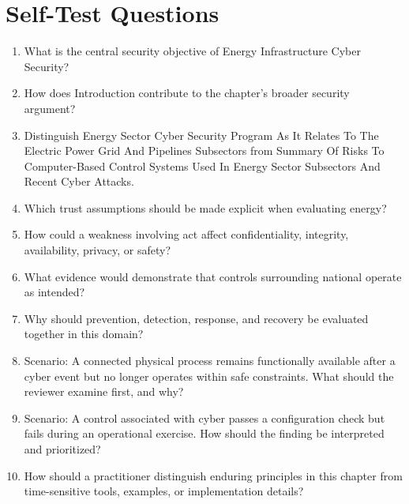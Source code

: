 \documentclass[11pt,letterpaper]{article}
\begin{document}
\section*{Self-Test Questions}
\begin{enumerate}
\item What is the central security objective of Energy Infrastructure Cyber Security?
\item How does Introduction contribute to the chapter's broader security argument?
\item Distinguish Energy Sector Cyber Security Program As It Relates To The Electric Power Grid And Pipelines Subsectors from Summary Of Risks To Computer-Based Control Systems Used In Energy Sector Subsectors And Recent Cyber Attacks.
\item Which trust assumptions should be made explicit when evaluating energy?
\item How could a weakness involving act affect confidentiality, integrity, availability, privacy, or safety?
\item What evidence would demonstrate that controls surrounding national operate as intended?
\item Why should prevention, detection, response, and recovery be evaluated together in this domain?
\item Scenario: A connected physical process remains functionally available after a cyber event but no longer operates within safe constraints. What should the reviewer examine first, and why?
\item Scenario: A control associated with cyber passes a configuration check but fails during an operational exercise. How should the finding be interpreted and prioritized?
\item How should a practitioner distinguish enduring principles in this chapter from time-sensitive tools, examples, or implementation details?
\end{enumerate}
\end{document}
